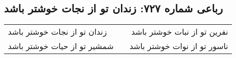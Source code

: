 \begin{center}
\section*{رباعی شماره ۷۲۷: زندان تو از نجات خوشتر باشد}
\label{sec:0727}
\begin{longtable}{l p{0.5cm} r}
زندان تو از نجات خوشتر باشد
&&
نفرین تو از نبات خوشتر باشد
\\
شمشیر تو از حیات خوشتر باشد
&&
ناسور تو از نوات خوشتر باشد
\\
\end{longtable}
\end{center}
